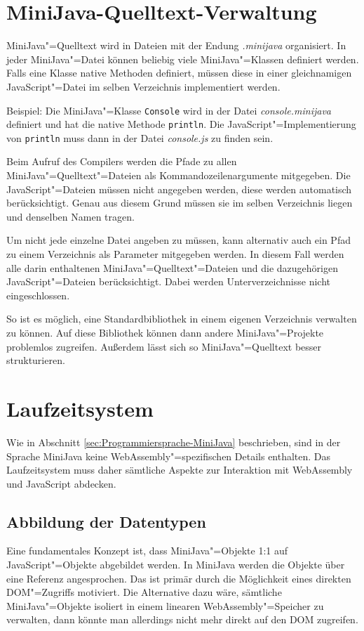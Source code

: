 

\section{MiniJava-Quelltext-Verwaltung}

MiniJava"=Quelltext wird in Dateien mit der Endung \emph{.minijava} organisiert. In jeder MiniJava"=Datei können beliebig viele MiniJava"=Klassen definiert werden. Falls eine Klasse native Methoden definiert, müssen diese in einer gleichnamigen JavaScript"=Datei im selben Verzeichnis implementiert werden.

Beispiel: Die MiniJava"=Klasse \lstinline{Console} wird in der Datei \emph{console.minijava} definiert und hat die native Methode \lstinline{println}. Die JavaScript"=Implementierung von \lstinline{println} muss dann in der Datei \emph{console.js} zu finden sein.

Beim Aufruf des Compilers werden die Pfade zu allen MiniJava"=Quelltext"=Dateien als Kommandozeilenargumente mitgegeben. Die JavaScript"=Dateien müssen nicht angegeben werden, diese werden automatisch berücksichtigt. Genau aus diesem Grund müssen sie im selben Verzeichnis liegen und denselben Namen tragen.

Um nicht jede einzelne Datei angeben zu müssen, kann alternativ auch ein Pfad zu einem Verzeichnis als Parameter mitgegeben werden. In diesem Fall werden alle darin enthaltenen MiniJava"=Quelltext"=Dateien und die dazugehörigen JavaScript"=Dateien berücksichtigt. Dabei werden Unterverzeichnisse nicht eingeschlossen.

So ist es möglich, eine Standardbibliothek in einem eigenen Verzeichnis verwalten zu können. Auf diese Bibliothek können dann andere MiniJava"=Projekte problemlos zugreifen. Außerdem lässt sich so MiniJava"=Quelltext besser strukturieren.

\section{Laufzeitsystem}

Wie in Abschnitt \ref{sec:Programmiersprache-MiniJava} beschrieben, sind in der Sprache MiniJava keine WebAssembly"=spezifischen Details enthalten. Das Laufzeitsystem muss daher sämtliche Aspekte zur Interaktion mit WebAssembly und JavaScript abdecken.

\subsection{Abbildung der Datentypen}
Eine fundamentales Konzept ist, dass MiniJava"=Objekte 1:1 auf JavaScript"=Objekte abgebildet werden. In MiniJava werden die Objekte über eine Referenz angesprochen. Das ist primär durch die Möglichkeit eines direkten DOM"=Zugriffs motiviert. Die Alternative dazu wäre, sämtliche MiniJava"=Objekte isoliert in einem linearen WebAssembly"=Speicher zu verwalten, dann könnte man allerdings nicht mehr direkt auf den DOM zugreifen.

